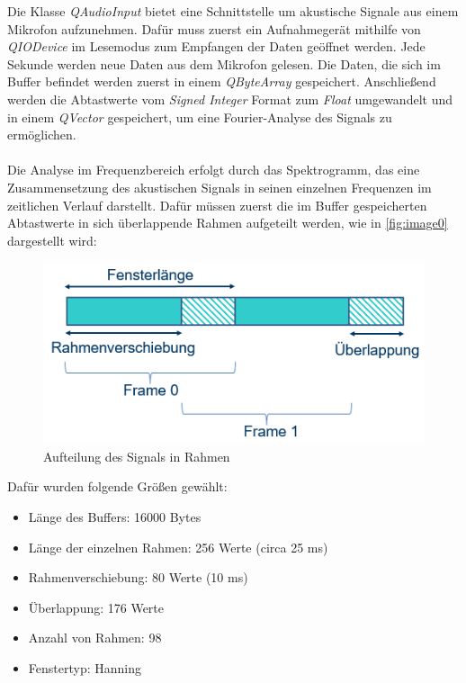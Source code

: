 Die Klasse \textit{QAudioInput} bietet eine Schnittstelle um akustische Signale aus einem Mikrofon aufzunehmen. Dafür muss zuerst ein Aufnahmegerät mithilfe von \textit{QIODevice} im Lesemodus zum Empfangen der Daten geöffnet werden. Jede Sekunde werden neue Daten aus dem Mikrofon gelesen. Die Daten, die sich im Buffer befindet werden zuerst in einem \textit{QByteArray} gespeichert. Anschließend werden die Abtastwerte vom \textit{Signed Integer} Format zum \textit{Float} umgewandelt und in einem \textit{QVector} gespeichert, um eine Fourier-Analyse des Signals zu ermöglichen.\\
\\
Die Analyse im Frequenzbereich erfolgt durch das Spektrogramm, das eine Zusammensetzung des akustischen Signals in seinen einzelnen Frequenzen im zeitlichen Verlauf darstellt. Dafür müssen zuerst die im Buffer gespeicherten Abtastwerte in sich überlappende Rahmen aufgeteilt werden, wie in \autoref{fig:image0} dargestellt wird:

\begin{figure}[h]
	\centering
	\includegraphics[width=1\textwidth]{beatcontrol/BeatBilder/bild0.png}
	\caption{Aufteilung des Signals in Rahmen}
	\label{fig:image0}
\end{figure}

Dafür wurden folgende Größen gewählt:
 
\begin{center}
	\begin{itemize}
		\item Länge des Buffers: 16000 Bytes
		\item Länge der einzelnen Rahmen: 256 Werte (circa 25 ms)
		\item Rahmenverschiebung: 80 Werte (10 ms)
		\item Überlappung: 176 Werte
		\item Anzahl von Rahmen: 98
		\item Fenstertyp: Hanning
	\end{itemize}
\end{center}


